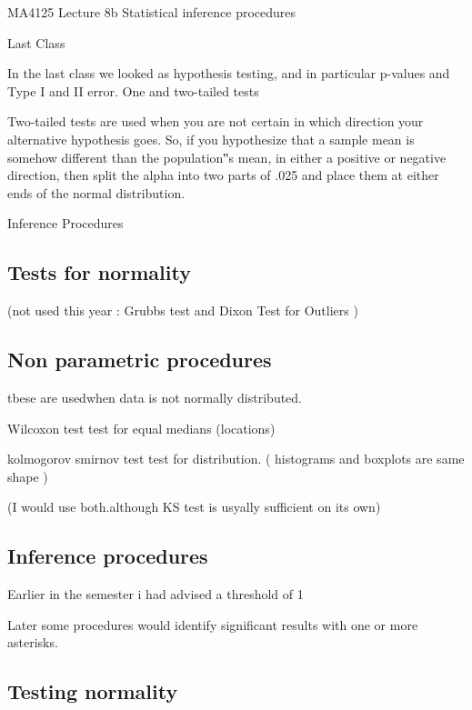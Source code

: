  
MA4125 Lecture 8b Statistical inference procedures

Last Class
 
In the last class we looked as hypothesis testing, and in particular p-values and Type I and II error.
One and two-tailed tests


Two-tailed tests are used when you are not certain in which direction your alternative hypothesis goes. So, if you hypothesize that a sample mean is somehow different than the population‟s mean, in either a positive or negative direction, then split the alpha into two parts of .025 and place them at either ends of the normal distribution.
 


Inference Procedures

\subsection*{Tests for normality}

(not used this year : Grubbs test and Dixon Test for Outliers )

\subsection*{Non parametric procedures }

tbese are usedwhen data is not normally distributed.

Wilcoxon test test for equal medians (locations)

kolmogorov smirnov test test for distribution. ( histograms and boxplots are same shape )

(I would use both.although KS test is usyally sufficient  on its own)


\subsection*{Inference procedures}

Earlier in the semester i had advised a threshold of 1%

Later some procedures would identify significant results with one or more asterisks. 

\subsection*{Testing normality}

